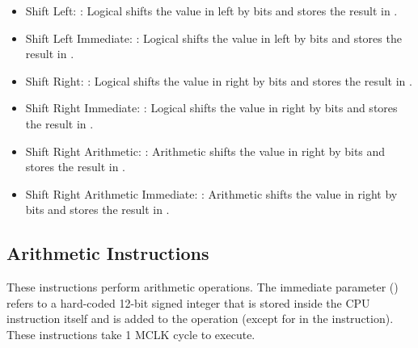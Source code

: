 \documentclass[11pt,pdftex,portrait,letterpaper]{article}
\begin{document}
\begin{itemize}
	\item Shift Left: : Logical shifts the value in  left by  bits and stores the result in .
	\item Shift Left Immediate: : Logical shifts the value in  left by  bits and stores the result in .
	\item Shift Right: : Logical shifts the value in  right by  bits and stores the result in .
	\item Shift Right Immediate: : Logical shifts the value in  right by  bits and stores the result in .
	\item Shift Right Arithmetic: : Arithmetic shifts the value in  right by  bits and stores the result in .
	\item Shift Right Arithmetic Immediate: : Arithmetic shifts the value in  right by  bits and stores the result in .
\end{itemize}

\subsection{Arithmetic Instructions}

These instructions perform arithmetic operations. The immediate parameter () refers to a hard-coded 12-bit signed integer that is stored inside the CPU instruction itself and is added to the operation (except for in the  instruction). These instructions take 1 MCLK cycle to execute.
\end{document}
